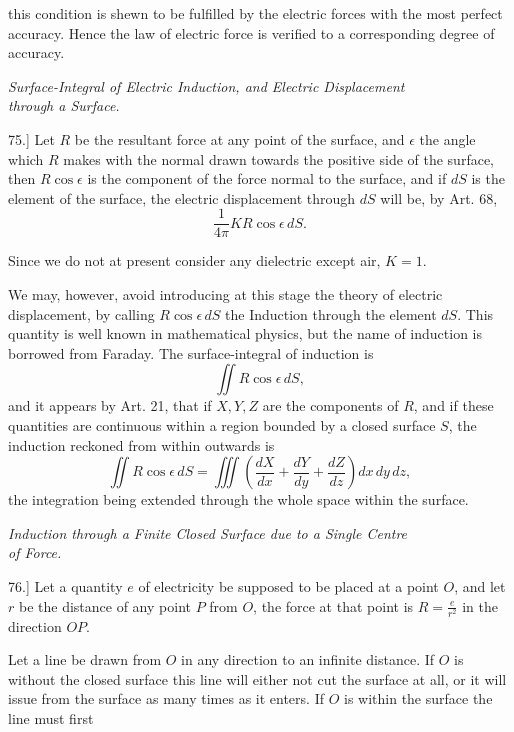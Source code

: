 \documentclass[11pt,a4paper]{article}
\begin{document}
\clearpage
\setcounter{footnote}{0}

this condition is shewn to be fulfilled by the electric forces with the
most perfect accuracy. Hence the law of electric force is verified to a
corresponding degree of accuracy.

\begin{center}
\textit{Surface-Integral of Electric Induction, and Electric Displacement\\
through a Surface.}
\end{center}

75.] Let \(R\) be the resultant force at any point of the surface, and
\(\epsilon\) the angle which \(R\) makes with the normal drawn towards
the positive side of the surface, then \(R\cos\epsilon\) is the component
of the force normal to the surface, and if \(dS\) is the element of the
surface, the electric displacement through \(dS\) will be, by Art. 68,
\[
\frac{1}{4\pi}KR\cos\epsilon\,dS.
\]

Since we do not at present consider any dielectric except air, \(K=1\).

We may, however, avoid introducing at this stage the theory of electric
displacement, by calling \(R\cos\epsilon\,dS\) the Induction through the
element \(dS\). This quantity is well known in mathematical physics,
but the name of induction is borrowed from Faraday. The surface-integral
of induction is
\[
\iint R\cos\epsilon\,dS,
\]
and it appears by Art. 21, that if \(X,Y,Z\) are the components of \(R\),
and if these quantities are continuous within a region bounded by a
closed surface \(S\), the induction reckoned from within outwards is
\[
\iint R\cos\epsilon\,dS
=
\iiint\left(\frac{dX}{dx}+\frac{dY}{dy}+\frac{dZ}{dz}\right)dx\,dy\,dz,
\]
the integration being extended through the whole space within the
surface.

\begin{center}
\textit{Induction through a Finite Closed Surface due to a Single Centre\\
of Force.}
\end{center}

76.] Let a quantity \(e\) of electricity be supposed to be placed at a
point \(O\), and let \(r\) be the distance of any point \(P\) from \(O\),
the force at that point is \(R=\frac{e}{r^2}\) in the direction \(OP\).

Let a line be drawn from \(O\) in any direction to an infinite distance.
If \(O\) is without the closed surface this line will either not cut the
surface at all, or it will issue from the surface as many times as it
enters. If \(O\) is within the surface the line must first
\end{document}
